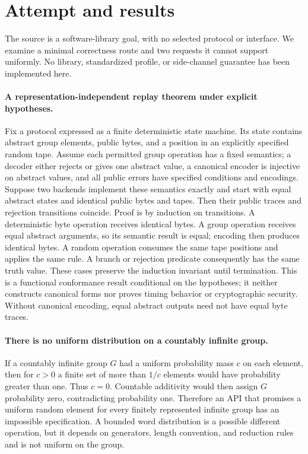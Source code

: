 \documentclass[11pt]{article}
\begin{document}
\section{Attempt and results}
The source is a software-library goal, with no selected protocol or interface.
We examine a minimal correctness route and two requests it cannot support
uniformly. No library, standardized profile, or side-channel guarantee has
been implemented here.

\paragraph{A representation-independent replay theorem under explicit hypotheses.}
Fix a protocol expressed as a finite deterministic state machine. Its state
contains abstract group elements, public bytes, and a position in an explicitly
specified random tape. Assume each permitted group operation has a fixed
semantics; a decoder either rejects or gives one abstract value, a canonical
encoder is injective on abstract values, and all public errors have specified
conditions and encodings. Suppose two backends implement these semantics
exactly and start with equal abstract states and identical public bytes and
tapes. Then their public traces and rejection transitions coincide.
Proof is by induction on transitions. A deterministic byte operation receives
identical bytes. A group operation receives equal abstract arguments, so its
semantic result is equal; encoding then produces identical bytes. A random
operation consumes the same tape positions and applies the same rule. A branch
or rejection predicate consequently has the same truth value. These cases
preserve the induction invariant until termination.
This is a functional conformance result conditional on the hypotheses; it
neither constructs canonical forms nor proves timing behavior or cryptographic
security. Without canonical encoding, equal abstract outputs need not have
equal byte traces.

\paragraph{There is no uniform distribution on a countably infinite group.}
If a countably infinite group $G$ had a uniform probability mass $c$ on each
element, then for $c>0$ a finite set of more than $1/c$ elements would have
probability greater than one. Thus $c=0$. Countable additivity would then
assign $G$ probability zero, contradicting probability one. Therefore an API
that promises a uniform random element for every finitely represented infinite
group has an impossible specification. A bounded word distribution is a
possible different operation, but it depends on generators, length convention,
and reduction rules and is not uniform on the group.
\end{document}
